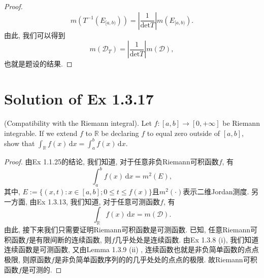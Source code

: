 \documentclass[reqno,a4paper,10pt]{amsart}
\newcommand\dif{\,\mathrm{d}}
\newcommand\Rnum{\mathbb{R}}
\newcommand{\abs}[1]{\left\vert#1\right\vert}
\begin{document}
\begin{proof}
    \begin{equation*}
        m(T^{-1}(E_{[a,b)}))=\abs{\frac{1}{\mathrm{det}T}}m(E_{[a,b)}).
    \end{equation*}
    由此, 我们可以得到
    \begin{equation*}
        m(\mathcal{D}_T)=\abs{\frac{1}{\mathrm{det}T}}m(\mathcal{D}),
    \end{equation*}
    也就是题设的结果.
\end{proof}

\section{Solution of Ex 1.3.17}
(Compatibility with the Riemann integral). Let $f:[a,b]\to [0,+\infty]$ be  Riemann integrable. If we extend $f$ to $\Rnum$ be declaring $f$ to equal zero outside of $[a,b]$, show that $\int_\Rnum f(x)\dif x=\int_a^b f(x)\dif x$.
\begin{proof}
	由Ex 1.1.25的结论, 我们知道, 对于任意非负Riemann可积函数$f$, 有
	\begin{equation*}
		\int_a^b f(x)\dif x=m^2(E),
	\end{equation*}
	其中, $E:=\{(x,t):x\in[a,b];0\leq t\leq f(x)\}$且$m^2(\cdot)$表示二维Jordan测度. 另一方面, 由Ex 1.3.13, 我们知道, 对于任意可测函数$f$, 有
	\begin{equation*}
		\int_\Rnum f(x)\dif x=m(\mathcal{D}).
	\end{equation*}
	由此, 接下来我们只需要证明Riemann可积函数是可测函数. 已知, 任意Riemann可积函数$f$是有限间断的连续函数, 则$f$几乎处处是连续函数. 由Ex 1.3.8 (i), 我们知道连续函数是可测函数, 又由Lemma 1.3.9 (ii) , 连续函数也就是非负简单函数的点点极限, 则原函数$f$是非负简单函数序列的的几乎处处的点点的极限. 故Riemann可积函数$f$是可测的. 
    \iffalse
	设$f$是区间$[a,b]$上的Riemann可积函数. 对于任意$\epsilon>0$, 存在两个分段常值函数$\psi,\phi$使得$\phi\leq f\leq \psi$且
	\begin{equation*}
		\int_a^b \psi(x)-\phi(x)\dif x\leq \epsilon.
	\end{equation*}
	其次, 我们知道, 任意区间$[a,b]$上的分段常值函数都是简单函数, 也是可测函数. 由单调性, 我们有
	\begin{equation*}
		\int_\Rnum \phi(x)\dif x\leq \underline{\int_\Rnum}f(x)\dif x,\;\;\;\int_\Rnum \psi(x)\dif x\geq \overline{\int_\Rnum}f(x)\dif x.
	\end{equation*}
	由$\epsilon$的任意性, 我们可以得到题设的结果. 
    \fi
\end{proof}
\end{document}
